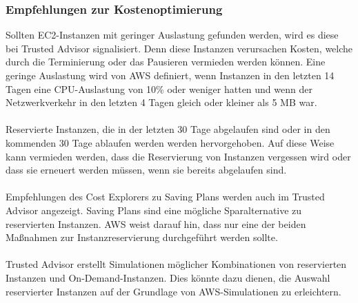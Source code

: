 \subsubsection*{Empfehlungen zur Kostenoptimierung}
Sollten EC2-Instanzen mit geringer Auslastung gefunden werden, wird es diese bei Trusted Advisor signalisiert. Denn diese Instanzen verursachen Kosten, welche durch die Terminierung oder das Pausieren vermieden werden können. Eine geringe Auslastung wird von AWS definiert, wenn Instanzen in den letzten 14 Tagen eine CPU-Auslastung von 10\% oder weniger hatten und wenn der Netzwerkverkehr in den letzten 4 Tagen gleich oder kleiner als 5 MB war. 
\\\\
Reservierte Instanzen, die in der letzten 30 Tage abgelaufen sind oder in den kommenden 30 Tage ablaufen werden werden hervorgehoben. Auf diese Weise kann vermieden werden, dass die Reservierung von Instanzen vergessen wird oder dass sie erneuert werden müssen, wenn sie bereits abgelaufen sind.
\\\\
Empfehlungen des Cost Explorers zu Saving Plans werden auch im Trusted Advisor angezeigt. Saving Plans sind eine mögliche Sparalternative zu reservierten Instanzen. AWS weist darauf hin, dass nur eine der beiden Maßnahmen zur Instanzreservierung durchgeführt werden sollte.
\\\\
Trusted Advisor erstellt Simulationen möglicher Kombinationen von reservierten Instanzen und On-Demand-Instanzen. Dies könnte dazu dienen, die Auswahl reservierter Instanzen auf der Grundlage von AWS-Simulationen zu erleichtern.

